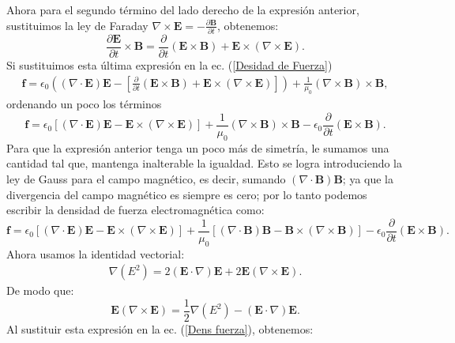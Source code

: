 \documentclass[11pt,fleqn]{book} %
\begin{document}
Ahora para el segundo t\'ermino del lado derecho de la expresi\'on anterior, sustituimos la ley  de Faraday $\nabla\times\textbf{E}=-\frac{\partial  \textbf{B}}{\partial t}$, obtenemos:
\begin{equation}
\frac{\partial\textbf{E}}{\partial t}\times\textbf{B}=\frac{\partial}{\partial t}(\textbf{E}\times\textbf{B})+\textbf{E}\times(\nabla\times\textbf{E}).
\end{equation}
Si sustituimos esta \'ultima expresi\'on en la ec. (\ref{Desidad de Fuerza})
\begin{eqnarray*}
\textbf{f}=\epsilon_{0}\left((\nabla\cdot\textbf{E})\textbf{E}-\left[\frac{\partial}{\partial t}(\textbf{E}\times\textbf{B})+\textbf{E}\times(\nabla\times\textbf{E}) \right]\right) +\frac{1}{\mu_{0}}(\nabla\times\textbf{B})\times\textbf{B},
\end{eqnarray*}
ordenando un poco los t\'erminos
\begin{equation}
\textbf{f}=\epsilon_{0}\left[(\nabla\cdot\textbf{E})\textbf{E}-\textbf{E}\times(\nabla\times\textbf{E})\right] +\frac{1}{\mu_{0}}(\nabla\times\textbf{B})\times\textbf{B}-\epsilon_{0}\frac{\partial}{\partial t}(\textbf{E}\times\textbf{B}).
\end{equation}
Para que la expresi\'on anterior tenga un poco m\'as de simetr\'ia, le sumamos una cantidad tal que, mantenga inalterable la igualdad. Esto se logra introduciendo la ley de Gauss para el campo magn\'etico, es decir, sumando $(\nabla\cdot\textbf{B})\textbf{B}$; ya que la divergencia del campo magn\'etico es siempre es cero; por lo tanto podemos escribir la densidad de fuerza electromagn\'etica como:
\begin{equation}
\textbf{f}=\epsilon_{0}\left[(\nabla\cdot\textbf{E})\textbf{E}-\textbf{E}\times(\nabla\times\textbf{E})\right] +\frac{1}{\mu_{0}}\left[(\nabla\cdot\textbf{B})\textbf{B}-\textbf{B}\times(\nabla\times\textbf{B})\right]-\epsilon_{0}\frac{\partial}{\partial t}(\textbf{E}\times\textbf{B}). \label{Dens fuerza}
\end{equation}
Ahora usamos la identidad vectorial:
\begin{eqnarray*}
\nabla(E^{2})=2(\textbf{E}\cdot\nabla)\textbf{E}+2\textbf{E}(\nabla\times\textbf{E}).
\end{eqnarray*}
De modo que:
\begin{equation}
\textbf{E}(\nabla\times\textbf{E})=\frac{1}{2}\nabla(E^{2})-(\textbf{E}\cdot\nabla)\textbf{E}.
\end{equation}
Al sustituir esta expresi\'on en la ec. (\ref{Dens fuerza}), obtenemos:
\end{document}
